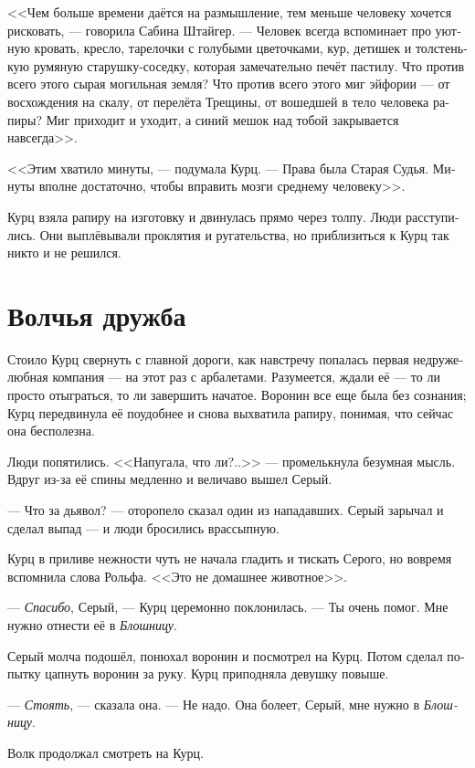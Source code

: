 \documentclass[a4paper,12pt,fleqn]{book}\usepackage{cooltooltips}\usepackage{polyglossia}\setdefaultlanguage[babelshorthands=true]{russian}\setotherlanguage{english}\defaultfontfeatures{Ligatures=TeX,Mapping=tex-text} \usepackage{xcolor}\definecolor{lightgray}{HTML}{bbbbbb}\color{lightgray}\newcommand{\ml}[3]{\textenglish{\textcolor{black}{#3}}}
\begin{document}
<<Чем больше времени даётся на размышление, тем меньше человеку хочется рисковать, --- говорила Сабина Штайгер.
--- Человек всегда вспоминает про уютную кровать, кресло, тарелочки с голубыми цветочками, кур, детишек и толстенькую румяную старушку-соседку, которая замечательно печёт пастилу.
Что против всего этого сырая могильная земля?
Что против всего этого миг эйфории --- от восхождения на скалу, от перелёта Трещины, от вошедшей в тело человека рапиры?
Миг приходит и уходит, а синий мешок над тобой закрывается навсегда>>.

<<Этим хватило минуты, --- подумала Курц.
--- Права была Старая Судья.
Минуты вполне достаточно, чтобы вправить мозги среднему человеку>>.

Курц взяла рапиру на изготовку и двинулась прямо через толпу.
Люди расступились.
Они выплёвывали проклятия и ругательства, но приблизиться к Курц так никто и не решился.

\section{Волчья дружба}

Стоило Курц свернуть с главной дороги, как навстречу попалась первая недружелюбная компания --- на этот раз с арбалетами.
Разумеется, ждали её --- то ли просто отыграться, то ли завершить начатое.
Воронин все еще была без сознания;
Курц передвинула её поудобнее и снова выхватила рапиру, понимая, что сейчас она бесполезна.

Люди попятились.
<<Напугала, что ли?..>> --- промелькнула безумная мысль.
Вдруг из-за её спины медленно и величаво вышел Серый.

--- Что за дьявол? --- оторопело сказал один из нападавших.
Серый зарычал и сделал выпад --- и люди бросились врассыпную.

Курц в приливе нежности чуть не начала гладить и тискать Серого, но вовремя вспомнила слова Рольфа.
<<Это не домашнее животное>>.

--- \textit{Спасибо}, Серый, --- Курц церемонно поклонилась.
--- Ты очень помог.
Мне нужно отнести её в \textit{Блошницу}.

Серый молча подошёл, понюхал воронин и посмотрел на Курц.
Потом сделал попытку цапнуть воронин за руку.
Курц приподняла девушку повыше.

--- \textit{Стоять}, --- сказала она.
--- Не надо.
Она болеет, Серый, мне нужно в \textit{Блошницу}.

Волк продолжал смотреть на Курц.
\end{document}
